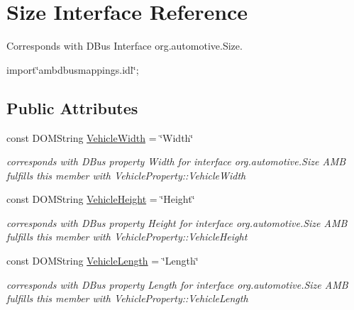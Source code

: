 \hypertarget{interfaceSize}{\section{Size Interface Reference}
\label{interfaceSize}
}


Corresponds with D\+Bus Interface org.\+automotive.\+Size.  




{\ttfamily import\char`\"{}ambdbusmappings.\+idl\char`\"{};}

\subsection*{Public Attributes}
\begin{DoxyCompactItemize}
\item 
\hypertarget{interfaceSize_a7d257d4908f33668b20f23889e06997e}{const D\+O\+M\+String \hyperlink{interfaceSize_a7d257d4908f33668b20f23889e06997e}{Vehicle\+Width} = \char`\"{}Width\char`\"{}}\label{interfaceSize_a7d257d4908f33668b20f23889e06997e}

\begin{DoxyCompactList}\small\item\em corresponds with D\+Bus property Width for interface org.\+automotive.\+Size A\+M\+B fulfills this member with Vehicle\+Property\+::\+Vehicle\+Width \end{DoxyCompactList}\item 
\hypertarget{interfaceSize_a1ccc569716b80530444fbd764119dad9}{const D\+O\+M\+String \hyperlink{interfaceSize_a1ccc569716b80530444fbd764119dad9}{Vehicle\+Height} = \char`\"{}Height\char`\"{}}\label{interfaceSize_a1ccc569716b80530444fbd764119dad9}

\begin{DoxyCompactList}\small\item\em corresponds with D\+Bus property Height for interface org.\+automotive.\+Size A\+M\+B fulfills this member with Vehicle\+Property\+::\+Vehicle\+Height \end{DoxyCompactList}\item 
\hypertarget{interfaceSize_af3f8d8c9ff0550556fb0a1021a1bbe74}{const D\+O\+M\+String \hyperlink{interfaceSize_af3f8d8c9ff0550556fb0a1021a1bbe74}{Vehicle\+Length} = \char`\"{}Length\char`\"{}}\label{interfaceSize_af3f8d8c9ff0550556fb0a1021a1bbe74}

\begin{DoxyCompactList}\small\item\em corresponds with D\+Bus property Length for interface org.\+automotive.\+Size A\+M\+B fulfills this member with Vehicle\+Property\+::\+Vehicle\+Length \end{DoxyCompactList}\end{DoxyCompactItemize}


